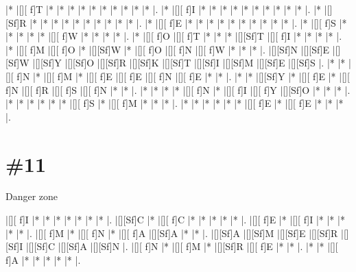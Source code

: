 \documentclass[letterpaper]{article}
\begin{document}
\vspace*{1em}
\begin{Puzzle}{12}{13}
|*        |[][ f]T  |*        |*        |*        |*        |*        |*        |*        |*        |*        |*        |.
|*        |[][ f]I  |*        |*        |*        |*        |*        |*        |*        |*        |*        |*        |.
|*        |[][Sf]R  |*        |*        |*        |*        |*        |*        |*        |*        |*        |*        |.
|*        |[][ f]E  |*        |*        |*        |*        |*        |*        |*        |*        |*        |*        |.
|*        |[][ f]S  |*        |*        |*        |*        |*        |[][ f]W  |*        |*        |*        |*        |.
|*        |[][ f]O  |[][ f]T  |*        |*        |*        |[][Sf]T  |[][ f]I  |*        |*        |*        |*        |.
|*        |[][ f]M  |[][ f]O  |*        |[][Sf]W  |*        |[][ f]O  |[][ f]N  |[][ f]W  |*        |*        |*        |.
|[][Sf]N  |[][Sf]E  |[][Sf]W  |[][Sf]Y  |[][Sf]O  |[][Sf]R  |[][Sf]K  |[][Sf]T  |[][Sf]I  |[][Sf]M  |[][Sf]E  |[][Sf]S  |.
|*        |*        |[][ f]N  |*        |[][ f]M  |*        |[][ f]E  |[][ f]E  |[][ f]N  |[][ f]E  |*        |*        |.
|*        |*        |[][Sf]Y  |*        |[][ f]E  |*        |[][ f]N  |[][ f]R  |[][ f]S  |[][ f]N  |*        |*        |.
|*        |*        |*        |*        |[][ f]N  |*        |[][ f]I  |[][ f]Y  |[][Sf]O  |*        |*        |*        |.
|*        |*        |*        |*        |*        |*        |[][ f]S  |*        |[][ f]M  |*        |*        |*        |.
|*        |*        |*        |*        |*        |*        |[][ f]E  |*        |[][ f]E  |*        |*        |*        |.
\end{Puzzle}


\section*{\#11}
Danger zone

\vspace*{1em}
\begin{Puzzle}{8}{7}
|[][ f]I  |*        |*        |*        |*        |*        |*        |*        |. 
|[][Sf]C  |*        |[][ f]C  |*        |*        |*        |*        |*        |.  
|[][ f]E  |*        |[][ f]I  |*        |*        |*        |*        |*        |.
|[][ f]M  |*        |[][ f]N  |*        |[][ f]A  |[][Sf]A  |*        |*        |.  
|[][Sf]A  |[][Sf]M  |[][Sf]E  |[][Sf]R  |[][Sf]I  |[][Sf]C  |[][Sf]A  |[][Sf]N  |.
|[][ f]N  |*        |[][ f]M  |*        |[][Sf]R  |[][ f]E  |*        |*        |. 
|*        |*        |[][ f]A  |*        |*        |*        |*        |*        |.
\end{Puzzle}
\end{document}
